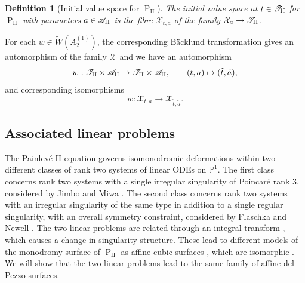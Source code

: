\documentclass[a4paper,reqno]{amsart}
\numberwithin{equation}{section}
\newcommand{\p}{\mathbb{P}}
\newcommand{\pain}[1]{\operatorname{P}_{\mathrm{#1}}}
\newtheorem{definition}[theorem]{Definition}
\numberwithin{equation}{section}
\begin{document}
\begin{definition}[Initial value space for $\pain{II}$]
    The initial value space at $t\in \mathscr{T}_{\rm{II}}$ for $\pain{II}$ with parameters $a\in\mathscr{A}_{\rm{II}}$ is the fibre $\mathcal{X}_{t,a}$ of the family $\mathcal{X}_a\to\mathscr{T}_{\rm{II}}$.
\end{definition}

For each $w \in \widetilde{W}(A_2^{(1)})$, the corresponding B\"acklund transformation gives an automorphism of the family $\mathcal{X}$ and we have an automorphism
$$w : \mathscr{T}_{\rm{II}}\times \mathscr{A}_{\rm{II}} \to \mathscr{T}_{\rm{II}}\times \mathscr{A}_{\rm{II}}, \qquad (t,a)\mapsto (\tilde{t},\tilde{a}),$$
and corresponding isomorphisms 
$$w : \mathcal{X}_{t,a} \to \mathcal{X}_{\tilde{t},\tilde{a}}.$$






\subsection{Associated linear problems}

The Painlev\'e II equation governs isomonodromic deformations within two different classes of rank two systems of linear ODEs on $\p^1$. 
The first class concerns rank two systems with a single irregular singularity of Poincar\'e rank 3, considered by Jimbo and Miwa \cite{jimbomiwaII1981}.
The second class concerns rank two systems with an irregular singularity of the same type in addition to a single regular singularity, with an overall symmetry constraint, considered by Flaschka and Newell \cite{flaschkanewell}. 
The two linear problems are related through an integral transform \cite{joshikitaevtreharneP1P2}, which causes a change in singularity structure.
These lead to different models of the monodromy surface of $\pain{II}$ as affine cubic surfaces \cites{putsaito,chekhovdecorated}, which are isomorphic \cite[Prop. 5.9]{JMR}. 
We will show that the two linear problems lead to the same family of affine del Pezzo surfaces.
\end{document}
